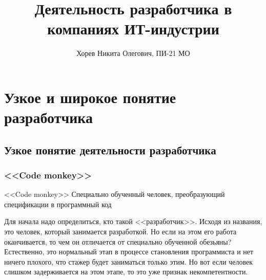 \documentclass{../industrial-development}
\title{Деятельность разработчика в компаниях ИТ-индустрии}
\author{Хорев Никита Олегович, ПИ-21 МО}
\date{}
\begin{document}
\begin{frame}
  \titlepage
\end{frame}


\section{Узкое и широкое понятие разработчика}
\subsection{Узкое понятие деятельности разработчика}
\begin{frame} \frametitle{<<Code monkey>>}
\begin{block}{<<Code monkey>>}
Специально обученный человек, преобразующий спецификации в программный код
\end{block}
\end{frame}
\lecturenotes
Для начала надо определиться, кто такой <<разработчик>>. Исходя из названия, это человек, который занимается разработкой. Но если на этом его работа оканчивается, то чем он отличается от специально обученной обезьяны?\\
Естественно, это нормальный этап в процессе становления программиста и нет ничего плохого, что стажер будет заниматься только этим. Но вот если человек слишком задерживается на этом этапе, то это уже признак некомпетентности.
\end{document}
